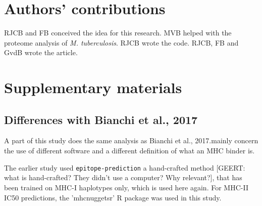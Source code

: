 \section{Authors' contributions}

RJCB and FB conceived the idea for this research. MVB helped with the proteome analysis of \emph{M. tuberculosis}.
RJCB wrote the code.
RJCB, FB and GvdB wrote the article.





\appendix
\section{Supplementary materials}

\subsection{Differences with Bianchi et al., 2017}

A part of this study does the same analysis as Bianchi et al., 2017.mainly concern the use of different
software and a different definition of what an MHC binder is.


The earlier study used \verb;epitope-prediction; a hand-crafted method [GEERT: what is hand-crafted? They didn't use a computer? Why relevant?], 
that has been trained on MHC-I haplotypes only,
which is used here again. For MHC-II IC50 predictions, the
'mhcnuggetsr' R package was used in this study.


